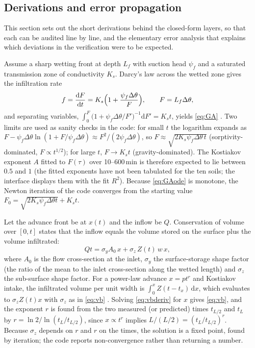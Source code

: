 \documentclass[preprint,12pt]{elsarticle}
\begin{document}
\subsection{Derivations and error propagation}
\label{sec:deriv}
This section sets out the short derivations behind the closed-form layers, so that each can be audited line by line, and the elementary error analysis that explains which deviations in the verification were to be expected.

Assume a sharp wetting front at depth $L_f$ with suction head $\psi_f$ and a saturated transmission zone of conductivity $K_s$. Darcy's law across the wetted zone gives the infiltration rate
\begin{equation}
f=\frac{\mathrm dF}{\mathrm dt}=K_s\Bigl(1+\frac{\psi_f\Delta\theta}{F}\Bigr),\qquad F=L_f\Delta\theta,
\label{eq:GAode}
\end{equation}
and separating variables, $\int_0^{F}\bigl(1+\psi_f\Delta\theta/F'\bigr)^{-1}\mathrm dF'=K_st$, yields \cref{eq:GA} \cite{GreenAmpt1911}. Two limits are used as sanity checks in the code: for small $t$ the logarithm expands as $F-\psi_f\Delta\theta\ln(1+F/\psi_f\Delta\theta)\approx F^2/(2\psi_f\Delta\theta)$, so $F\approx\sqrt{2K_s\psi_f\Delta\theta\,t}$ (sorptivity-dominated, $F\propto t^{1/2}$); for large $t$, $F\to K_st$ (gravity-dominated). The Kostiakov exponent $A$ fitted to $F(\tau)$ over 10--600\,min is therefore expected to lie between $0.5$ and $1$ (the fitted exponents have not been tabulated for the ten soils; the interface displays them with the fit $R^2$). Because \cref{eq:GAode} is monotone, the Newton iteration of the code converges from the starting value $F_0=\sqrt{2K_s\psi_f\Delta\theta t}+K_st$.

Let the advance front be at $x(t)$ and the inflow be $Q$. Conservation of volume over $[0,t]$ states that the inflow equals the volume stored on the surface plus the volume infiltrated:
\begin{equation}
Qt=\sigma_yA_0\,x+\sigma_z\,Z(t)\,w\,x,
\label{eq:vbderiv}
\end{equation}
where $A_0$ is the flow cross-section at the inlet, $\sigma_y$ the surface-storage shape factor (the ratio of the mean to the inlet cross-section along the wetted length) and $\sigma_z$ the sub-surface shape factor. For a power-law advance $x=pt^{r}$ and Kostiakov intake, the infiltrated volume per unit width is $\int_0^x Z(t-t_x)\,\mathrm dx$, which evaluates to $\sigma_zZ(t)x$ with $\sigma_z$ as in \cref{eq:vb} \cite{Elliott1982,Walker1987}. Solving \cref{eq:vbderiv} for $x$ gives \cref{eq:vb}, and the exponent $r$ is found from the two measured (or predicted) times $t_{L/2}$ and $t_L$ by $r=\ln 2/\ln(t_L/t_{L/2})$, since $x\propto t^{r}$ implies $L/(L/2)=(t_L/t_{L/2})^{r}$. Because $\sigma_z$ depends on $r$ and $r$ on the times, the solution is a fixed point, found by iteration; the code reports non-convergence rather than returning a number.
\end{document}
